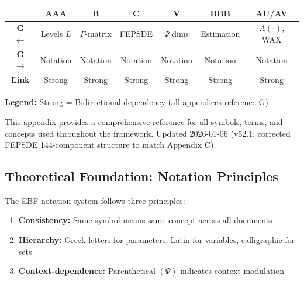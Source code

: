
\begin{tcolorbox}[colback=white, colframe=black,
    title=\textbf{Cross-Reference Map}]

\begin{center}
\small
\begin{tabular}{@{}c|cccccc@{}}
\toprule
& \textbf{AAA} & \textbf{B} & \textbf{C} & \textbf{V} & \textbf{BBB} & \textbf{AU/AV} \\
\midrule
\textbf{G $\leftarrow$} & Levels $L$ & $\Gamma$-matrix & FEPSDE & $\Psi$ dims & Estimation & $A(\cdot)$, WAX \\
\textbf{G $\rightarrow$} & Notation & Notation & Notation & Notation & Notation & Notation \\
\midrule
\textbf{Link} & \cellcolor{red!20}Strong & \cellcolor{red!20}Strong & \cellcolor{red!20}Strong & \cellcolor{red!20}Strong & \cellcolor{red!20}Strong & \cellcolor{red!20}Strong \\
\bottomrule
\end{tabular}
\end{center}

\textbf{Legend:}
\colorbox{red!20}{Strong} = Bidirectional dependency (all appendices reference G)

\end{tcolorbox}

This appendix provides a comprehensive reference for all symbols, terms, and concepts used throughout the framework. Updated 2026-01-06 (v52.1: corrected FEPSDE 144-component structure to match Appendix C).

\subsection{Theoretical Foundation: Notation Principles}
\label{sec:glossary-theory}

The EBF notation system follows three principles:

\begin{enumerate}
    \item \textbf{Consistency:} Same symbol means same concept across all documents
    \item \textbf{Hierarchy:} Greek letters for parameters, Latin for variables, calligraphic for sets
    \item \textbf{Context-dependence:} Parenthetical $(\Psi)$ indicates context modulation
\end{enumerate}

